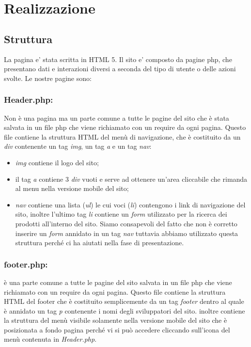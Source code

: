 \section{Realizzazione}
\subsection{Struttura}
La pagina e' stata scritta in HTML 5.\newline
Il sito e' composto da pagine php, che presentano dati e interazioni diversi a seconda del tipo di utente o delle azioni svolte.
Le nostre pagine sono:

	
 \subsubsection{Header.php:}\Spazio Non è una pagina ma un parte comune a tutte le pagine del sito che è stata salvata in un file php che viene richiamato con un require da ogni pagina. Questo file contiene la struttura HTML del menù di navigazione, che è costituito da un \emph{div} contenente un tag \emph{img}, un tag \emph{a} e un tag \emph{nav}:
 \begin{itemize}
 	\item \emph{img} contiene il logo del sito;
 	\item il tag \emph{a} contiene 3 \emph{div} vuoti e serve ad ottenere un'area cliccabile che rimanda al menu nella versione mobile del sito; 
 	\item \emph{nav} contiene una lista (\emph{ul}) le cui voci (\emph{li}) contengono i link di navigazione del sito, inoltre l'ultimo tag \emph{li} contiene un \emph{form} utilizzato per la ricerca dei prodotti all'interno del sito. \newline
 	Siamo consapevoli del fatto che non è corretto inserire un \emph{form} annidato in un tag \emph{nav} tuttavia abbiamo utilizzato questa struttura perché ci ha aiutati nella fase di presentazione.
 	
 \end{itemize}


 \subsubsection{footer.php:} \Spazio è una parte comune a tutte le pagine del sito salvata in un file php che viene richiamato con un require da ogni pagina.
 Questo file contiene la struttura HTML del footer che è costituito semplicemente da un tag \emph{footer} dentro al quale è annidato un tag \emph{p} contenente i nomi degli sviluppatori del sito. 
 inoltre contiene la struttura del menù visibile solamente nella versione mobile del sito che è posizionata a fondo pagina perché vi si può accedere cliccando sull'icona del menù contenuta in \emph{Header.php}.
	
